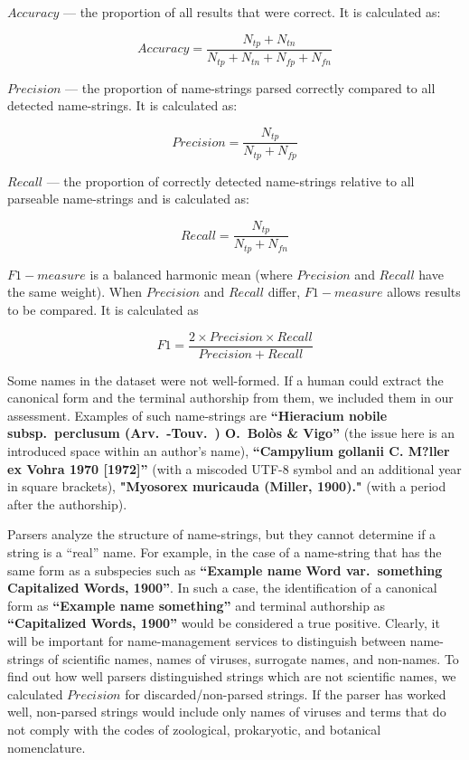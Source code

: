 \documentclass{bmcart}
\begin{document}
$Accuracy$ --- the proportion of all results that were correct. It is calculated as:

\[Accuracy = \dfrac{N_{tp} + N_{tn}}{N_{tp} + N_{tn} + N_{fp} + N_{fn}}\]

$Precision$ --- the proportion of name-strings parsed correctly compared to all detected name-strings. It is calculated as:

\[Precision = \dfrac{N_{tp}}{N_{tp} + N_{fp}}\]

$Recall$ --- the proportion of correctly detected name-strings relative to all parseable name-strings and is calculated as:

\[Recall = \dfrac{N_{tp}}{N_{tp} + N_{fn}}\]

$F1-measure$ is a balanced harmonic mean (where $Precision$ and $Recall$ have the same weight). When $Precision$ and $Recall$ differ, $F1-measure$ allows results to be compared. It is calculated as

\[F1 = \dfrac{2 \times Precision \times Recall}{Precision + Recall}\]


Some names in the dataset were not well-formed. If a human could extract the canonical form and the terminal authorship from them, we included them in our assessment.  Examples of such name-strings are \textbf{``Hieracium nobile subsp.\ perclusum (Arv.\ -Touv.\ ) O.\ Bolòs \& Vigo''} (the issue here is an introduced space within an author's name), \textbf{``Campylium gollanii C. M?ller ex Vohra 1970 [1972]''} (with a miscoded UTF-8 symbol and an additional year in square brackets), \textbf{"Myosorex muricauda (Miller, 1900)."} (with a period after the authorship).

Parsers analyze the structure of name-strings, but they cannot determine if a string is a ``real'' name. For example, in the case of a name-string that has the same form as a subspecies such as \textbf{``Example name Word var.\ something Capitalized Words, 1900''}. In such a case, the identification of a canonical form as \textbf{``Example name something''} and terminal authorship as \textbf{``Capitalized Words, 1900''} would be considered a true positive.  Clearly, it will be important for name-management services to distinguish between name-strings of scientific names, names of viruses, surrogate names, and non-names. To find out how well parsers distinguished strings which are not scientific names, we calculated $Precision$ for discarded/non-parsed strings.  If the parser has worked well, non-parsed strings would include only names of viruses and terms that do not comply with the codes of zoological, prokaryotic, and botanical nomenclature.
\end{document}
